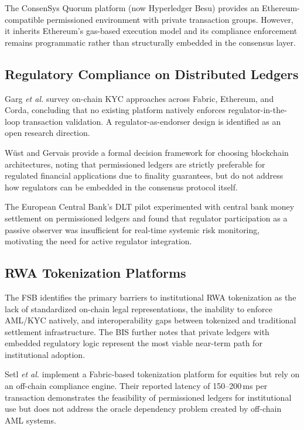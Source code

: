 \documentclass[journal,10pt,twocolumn]{IEEEtran}
\begin{document}
The ConsenSys Quorum platform (now Hyperledger Besu) \cite{ref:quorum} provides an Ethereum-compatible permissioned environment with private transaction groups. However, it inherits Ethereum's gas-based execution model and its compliance enforcement remains programmatic rather than structurally embedded in the consensus layer.

\subsection{Regulatory Compliance on Distributed Ledgers}

Garg \textit{et al.} \cite{ref:garg2021} survey on-chain KYC approaches across Fabric, Ethereum, and Corda, concluding that no existing platform natively enforces regulator-in-the-loop transaction validation. A regulator-as-endorser design is identified as an open research direction.

Wüst and Gervais \cite{ref:wust2018} provide a formal decision framework for choosing blockchain architectures, noting that permissioned ledgers are strictly preferable for regulated financial applications due to finality guarantees, but do not address how regulators can be embedded in the consensus protocol itself.

The European Central Bank's DLT pilot \cite{ref:ecb_dlt} experimented with central bank money settlement on permissioned ledgers and found that regulator participation as a passive observer was insufficient for real-time systemic risk monitoring, motivating the need for active regulator integration.

\subsection{RWA Tokenization Platforms}

The FSB \cite{ref:rwa_fsb} identifies the primary barriers to institutional RWA tokenization as the lack of standardized on-chain legal representations, the inability to enforce AML/KYC natively, and interoperability gaps between tokenized and traditional settlement infrastructure. The BIS \cite{ref:bis_tokenisation} further notes that private ledgers with embedded regulatory logic represent the most viable near-term path for institutional adoption.

Setl \textit{et al.} \cite{ref:setl2023} implement a Fabric-based tokenization platform for equities but rely on an off-chain compliance engine. Their reported latency of 150--200\,ms per transaction demonstrates the feasibility of permissioned ledgers for institutional use but does not address the oracle dependency problem created by off-chain AML systems.
\end{document}
